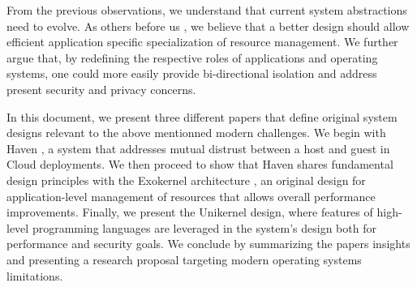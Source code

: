 From the previous observations, we understand that current system abstractions need to evolve.
As others before us \cite{DBLP:conf/sosp/EnglerKO95,DBLP:conf/hotos/EnglerK95,DBLP:conf/sosp/KaashoekEGBHMPGM97,DBLP:journals/tocs/CaoFKL96,DBLP:journals/sigops/HartyC92}, we believe that a better design should allow efficient application specific specialization of resource management.
We further argue that, by redefining the respective roles of applications and operating systems, one could more easily provide bi-directional isolation and address present security and privacy concerns.

In this document, we present three different papers that define original system designs relevant to the above mentionned modern challenges.
We begin with Haven \cite{DBLP:journals/tocs/BaumannPH15}, a system that addresses mutual distrust between a host and guest in Cloud deployments.
We then proceed to show that Haven shares fundamental design principles with the Exokernel architecture \cite{DBLP:conf/sosp/EnglerKO95}, an original design for application-level management of resources that allows overall performance improvements.
Finally, we present the Unikernel \cite{DBLP:conf/asplos/MadhavapeddyMRSSGSHC13} design, where features of high-level programming languages are leveraged in the system's design both for performance and security goals.
We conclude by summarizing the papers insights and presenting a research proposal targeting modern operating systems limitations.